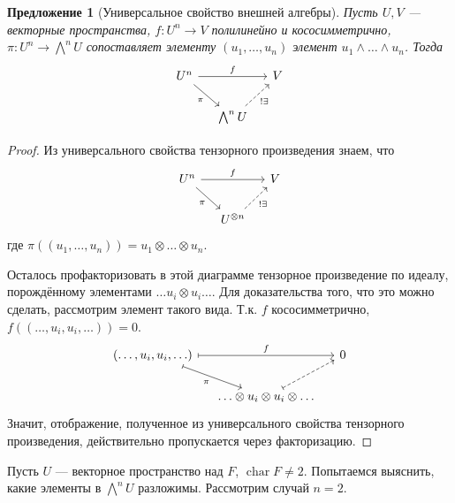 \documentclass{article}
\newtheorem*{proposition}{Предложение}
\theoremstyle{definition}
\theoremstyle{remark}
\DeclareMathOperator{\chr}{char}
\begin{document}
\begin{proposition}[Универсальное свойство внешней алгебры]
    Пусть $U, V$ --- векторные пространства, $f: U^n \to V$ полилинейно и кососимметрично, $\pi: U^n \to \bigwedge^n U$ сопоставляет элементу $(u_1, \hdots, u_n)$ элемент $u_1 \wedge \hdots \wedge u_n$. Тогда
    \begin{equation*}
        \begin{tikzcd}[column sep=small]
            U^n \arrow{rr}{f} \arrow{dr}[below left]{\pi} & & V \\
            & \bigwedge^n U \arrow[dashed]{ur}[below right]{! \exists}
        \end{tikzcd}
    \end{equation*}
\end{proposition}
\begin{proof}
    Из универсального свойства тензорного произведения знаем, что
    \begin{equation*}
        \begin{tikzcd}[column sep=small]
            U^n \arrow{rr}{f} \arrow{dr}[below left]{\pi} & & V \\
            & U^{\otimes n} \arrow[dashed]{ur}[below right]{! \exists}
        \end{tikzcd}
    \end{equation*}
    где $\pi((u_1, \hdots, u_n)) = u_1 \otimes \hdots \otimes u_n$.

    Осталось профакторизовать в этой диаграмме тензорное произведение по идеалу, порождённому элементами $\hdots u_i \otimes u_i \hdots$. Для доказательства того, что это можно сделать, рассмотрим элемент такого вида. Т.к. $f$ кососимметрично, $f((\hdots, u_i, u_i, \hdots)) = 0$.
    \begin{equation*}
        \begin{tikzcd}[column sep=small]
            (\hdots, u_i, u_i, \hdots) \arrow[mapsto]{rr}{f} \arrow[mapsto]{dr}[below left]{\pi} & & 0 \\
            & \hdots \otimes u_i \otimes u_i \otimes \hdots \arrow[dashed, mapsto]{ur}
        \end{tikzcd}
    \end{equation*}
    Значит, отображение, полученное из универсального свойства тензорного произведения, действительно пропускается через факторизацию.
\end{proof}

Пусть $U$ --- векторное пространство над $F$, $\chr F \neq 2$. Попытаемся выяснить, какие элементы в $\bigwedge^n U$ разложимы. Рассмотрим случай $n = 2$.
\end{document}
